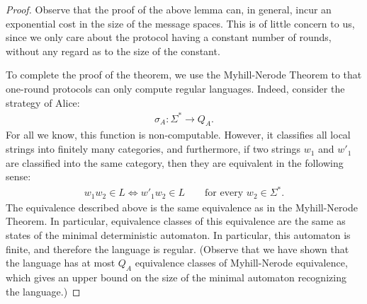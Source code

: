 \begin{proof}
  Observe that the proof of the above lemma can, in general, incur an exponential cost in the size of the message spaces. This is of little concern to us, since we only care about the protocol having a constant number of rounds, without  any regard as to the size of the constant. 

  To complete the proof of the theorem, we use the  Myhill-Nerode Theorem to that one-round protocols can only compute regular languages.  Indeed, consider the strategy of  Alice: 
  \begin{align*}
  \sigma_A : \Sigma^* \to Q_A.
  \end{align*}
  For all we know, this function is non-computable. However, it classifies all local strings into finitely many categories, and furthermore, if two strings $w_1$ and $w'_1$ are classified into the same category, then they are equivalent in the following sense: 
  \begin{align}\label{eq:myhill-nerode-equivalence}
  w_1 w_2 \in L \Leftrightarrow w'_1 w_2 \in L 
  \qquad \text{for every $w_2 \in \Sigma^*$.}
  \end{align}
  The equivalence described above is the same equivalence as in the Myhill-Nerode Theorem. In particular, equivalence classes of this equivalence are the same as states of the minimal deterministic automaton. In particular, this automaton is finite, and therefore the language is regular.  (Observe that we have shown that the language has at most $Q_A$ equivalence classes of Myhill-Nerode equivalence, which gives an upper bound on the size of the minimal automaton recognizing the language.)
\end{proof}

